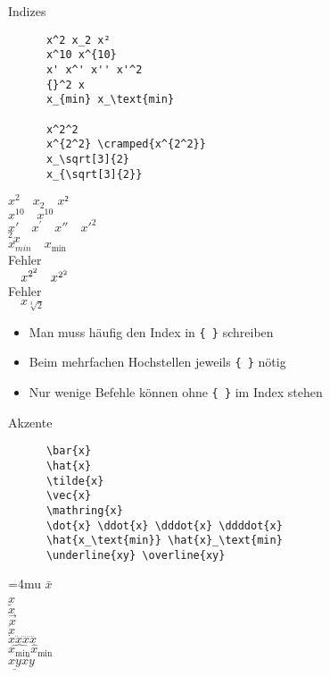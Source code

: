 \begin{frame}[fragile]{Indizes}
  \begin{CodeExample}{0.50}
    \begin{lstlisting}
      x^2 x_2 x²
      x^10 x^{10}
      x' x^' x'' x'^2
      {}^2 x
      x_{min} x_\text{min}

      x^2^2 
      x^{2^2} \cramped{x^{2^2}}
      x_\sqrt[3]{2}
      x_{\sqrt[3]{2}}
    \end{lstlisting}
  \CodeResult
    $x^2 \quad x_2 \quad x²$ \\
    $x^10 \quad x^{10}$ \\
    $x' \quad x^{'} \quad x'' \quad x'^2$ \\
    ${}^2 x$ \\
    $x_{min} \quad x_\text{min}$ \\[\baselineskip]
    \alert{Fehler}\\
    $\quad x^{2^2} \quad \cramped{x^{2^2}}$ \\
    \alert{Fehler} \\
    $\quad x_{\sqrt[3]{2}}$
  \end{CodeExample}
  \begin{itemize}
    \item Man muss häufig den Index in \lstinline+{ }+ schreiben
    \item Beim mehrfachen Hochstellen jeweils \lstinline+{ }+ nötig
    \item Nur wenige Befehle können ohne \lstinline+{ }+ im Index stehen
  \end{itemize}
\end{frame}

\begin{frame}[fragile]{Akzente}
  \begin{CodeExample}{0.70}
    \begin{lstlisting}
      \bar{x}
      \hat{x}
      \tilde{x}
      \vec{x}
      \mathring{x}
      \dot{x} \ddot{x} \dddot{x} \ddddot{x}
      \hat{x_\text{min}} \hat{x}_\text{min}
      \underline{xy} \overline{xy}
    \end{lstlisting}
  \CodeResult
    \Umathordordspacing\textstyle=4mu
    $\bar{x}$ \\
    $\hat{x}$ \\
    $\tilde{x}$ \\
    $\vec{x}$ \\
    $\mathring{x}$ \\
    $\dot{x} \ddot{x} \dddot{x} \ddddot{x}$ \\
    $\hat{x_\text{min}} \hat{x}_\text{min}$ \\
    $\underline{xy} \overline{xy}$
  \end{CodeExample}
\end{frame}

